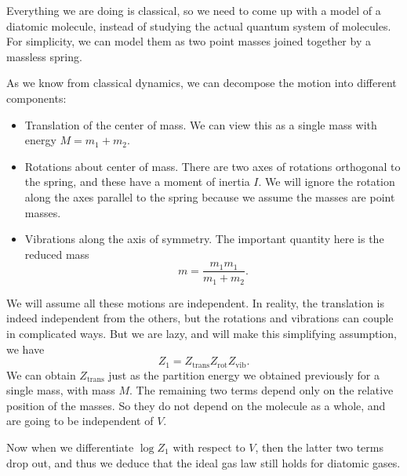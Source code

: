\documentclass[a4paper]{article}
\begin{document}
Everything we are doing is classical, so we need to come up with a model of a diatomic molecule, instead of studying the actual quantum system of molecules. For simplicity, we can model them as two point masses joined together by a massless spring.
\begin{center}
\end{center}
As we know from classical dynamics, we can decompose the motion into different components:
\begin{itemize}
  \item Translation of the center of mass. We can view this as a single mass with energy $M = m_1 + m_2$.
  \item Rotations about center of mass. There are two axes of rotations orthogonal to the spring, and these have a moment of inertia $I$. We will ignore the rotation along the axes parallel to the spring because we assume the masses are point masses.
  \item Vibrations along the axis of symmetry. The important quantity here is the reduced mass
    \[
      m = \frac{m_1 m_1}{m_1 + m_2}.
    \]
\end{itemize}
We will assume all these motions are independent. In reality, the translation is indeed independent from the others, but the rotations and vibrations can couple in complicated ways. But we are lazy, and will make this simplifying assumption, we have
\[
  Z_1 = Z_{\mathrm{trans}} Z_{\mathrm{rot}} Z_{\mathrm{vib}}.
\]
We can obtain $Z_{\mathrm{trans}}$ just as the partition energy we obtained previously for a single mass, with mass $M$. The remaining two terms depend only on the relative position of the masses. So they do not depend on the molecule as a whole, and are going to be independent of $V$.

Now when we differentiate $\log Z_1$ with respect to $V$, then the latter two terms drop out, and thus we deduce that the ideal gas law still holds for diatomic gases.
\end{document}
